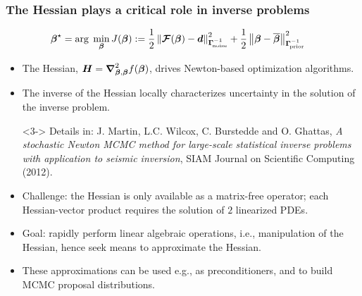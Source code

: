 \documentclass[10pt,final,xcolor=dvipsnames,aspect ratio=169]{beamer}
\begin{document}
\begin{frame}
	\frametitle{The Hessian plays a critical role in inverse problems}
	
	\begin{alignat*}{2}
	\boldsymbol{\beta}^{\star}&=  \arg \;
	\min_{\boldsymbol{\beta}} J(\boldsymbol{\beta}):= \frac{1}{2} \left\|  \boldsymbol{\mathcal{F}}(\boldsymbol{\beta}) -\boldsymbol{d}
	\right\|^2_{\boldsymbol{\Gamma}_{\!\mbox{\tiny noise}}^{-1}}
	+ \frac{1}{2} \left\|\boldsymbol{\beta} - \overline{\boldsymbol{\beta}}\right\|^2_{\boldsymbol{\Gamma}_{\!\mbox{\tiny prior}}^{-1}}
	\end{alignat*}
	
	\begin{itemize}
		\item<2-> The Hessian, $\boldsymbol{H}=\boldsymbol{\nabla}^{2}_{\boldsymbol{\beta},\boldsymbol{\beta}}f(\boldsymbol{\beta})$, drives Newton-based optimization algorithms.%
		\vspace{0.1in}
		\item<3-> The inverse of the Hessian locally characterizes uncertainty
		in the solution of the inverse problem.
		\item[]<3-> \scriptsize{Details in: J. Martin, L.C. Wilcox, C. Burstedde and O. Ghattas, {\em A stochastic Newton MCMC method for large-scale statistical inverse problems with application to seismic inversion}, SIAM Journal on Scientific Computing (2012).}		
		\vspace{0.1in}
		\item<4-> \alert{Challenge}: the Hessian is only available as a matrix-free operator; each Hessian-vector product requires the solution of $2$ linearized PDEs.
		\vspace{0.1in}
		\item<5-> \alert{Goal}: rapidly perform linear algebraic operations, i.e.,
		manipulation of the Hessian, hence \alert{seek
			means to approximate the Hessian}.
		\vspace{0.1in}
		\item<6-> These approximations can be used e.g., as
		\alert{preconditioners}, and to build MCMC proposal distributions.
	\end{itemize}
\end{frame}


\end{document}
